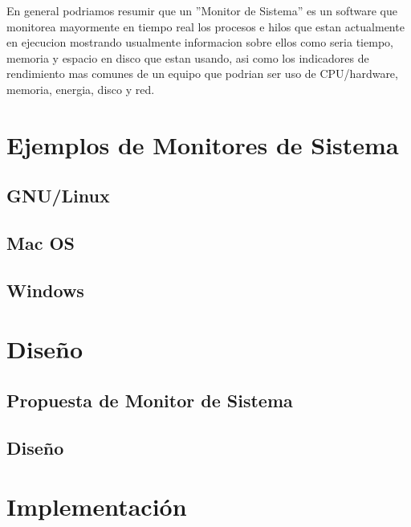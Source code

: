 \documentclass[a4paper,11pt]{article}
\begin{document}
En general podriamos resumir que un ''Monitor de Sistema'' es un software que monitorea mayormente en tiempo real los procesos e hilos que estan actualmente en ejecucion mostrando usualmente informacion sobre ellos como seria tiempo, memoria y espacio en disco que estan usando, asi como los indicadores de rendimiento mas comunes de un equipo que podrian ser uso de CPU/hardware, memoria, energia, disco y red.

\section{Ejemplos de Monitores de Sistema}

\subsection{GNU/Linux}

\subsection{Mac OS}

\subsection{Windows}

\section{Diseño}

\subsection{Propuesta de Monitor de Sistema}

\subsection{Diseño}

\section{Implementación}
\end{document}
